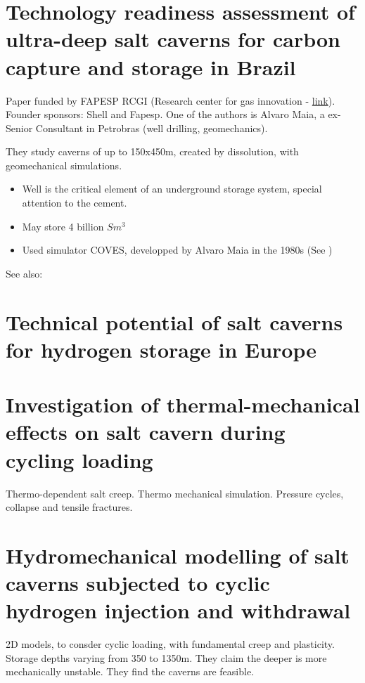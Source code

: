 \documentclass[a4paper]{article}
\begin{document}
\section{\cite{goulart20} Technology readiness assessment of ultra-deep salt caverns for carbon capture and storage in Brazil}

Paper funded by FAPESP RCGI (Research center for gas innovation - \href{https://sites.usp.br/rcgi/br/rgci_br/}{link}). Founder sponsors: Shell and Fapesp. One of the authors is Alvaro Maia, a ex-Senior Consultant in Petrobras (well drilling, geomechanics).

They study caverns of up to 150x450m, created by dissolution, with geomechanical simulations.

\begin{itemize}
\item Well is the critical element of an underground storage system, special attention to the cement.
\item May store 4 billion $Sm^3$
\item Used simulator COVES, developped by Alvaro Maia in the 1980s (See \cite{maia1984})
\end{itemize}

See also: \cite{abreu23}

\section{\cite{caglayan2020}Technical potential of salt caverns for hydrogen storage in Europe}


\section{\cite{li2021investigation} Investigation of thermal-mechanical effects on salt cavern during cycling loading}

Thermo-dependent salt creep. Thermo mechanical simulation. Pressure cycles, collapse and tensile fractures.

\section{\cite{coarita23} Hydromechanical modelling of salt caverns subjected to cyclic hydrogen injection and withdrawal}

2D models, to consder cyclic loading, with fundamental creep and plasticity. Storage depths varying from 350 to 1350m. They claim the deeper is more mechanically unstable. They find the caverns are feasible.
\end{document}
